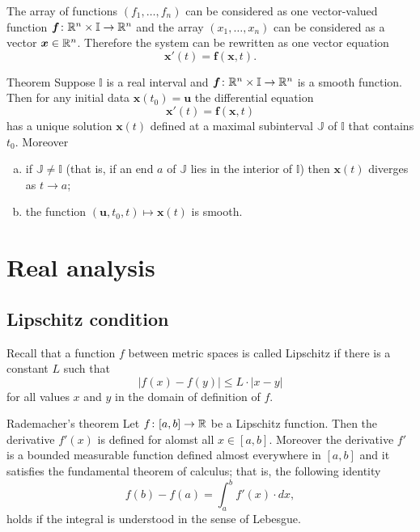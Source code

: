The array of functions $(f_1,\dots,f_n)$ can be considered as one vector-valued function 
$\bm{f}\colon\mathbb{R}^n\times \mathbb{I}\to \mathbb{R}^n$ and the array $(x_1,\dots,x_n)$ can be considered as a vector  $\bm{x}\in\mathbb{R}^n$.
Therefore the system can be rewritten as one vector equation 
\[\bm{x}'(t)=\bm{f}(\bm{x}, t).\] 

\begin{thm}{Theorem}\label{thm:ODE}
Suppose $\mathbb{I}$ is a real interval and $\bm{f}\colon\mathbb{R}^n\times\mathbb{I}\to \mathbb{R}^n$ is a smooth function.
Then for any initial data $\bm{x}(t_0)=\bm{u}$ the differential equation 
\[\bm{x}'(t)=\bm{f}(\bm{x},t)\]
has a unique solution $\bm{x}(t)$ defined at a maximal subinterval $\mathbb{J}$ of $\mathbb{I}$ that contains $t_0$.
Moreover
\begin{enumerate}[(a)]
\item  if $\mathbb{J}\ne \mathbb{I}$ (that is, if an end $a$ of $\mathbb{J}$ lies in the interior of $\mathbb{I}$) then $\bm{x}(t)$ diverges as $t\to a$;
\item  the function $(\bm{u},t_0,t)\mapsto \bm{x}(t)$ is smooth.
\end{enumerate}


\end{thm}

\chapter{Real analysis}

\section{Lipschitz condition}

Recall that a function $f$ between metric spaces is called Lipschitz if there is a constant $L$ such that 
\[|f(x)-f(y)|\le L\cdot|x-y|\]
for all values $x$ and $y$ in the domain of definition of $f$.

\begin{thm}{Rademacher's theorem}\label{thm:rademacher}
Let $f\colon[a,b]\to\mathbb{R}$ be a Lipschitz function.
Then the derivative $f'(x)$ is defined for alomst all $x\in [a,b]$.
Moreover the derivative $f'$ is a bounded measurable function defined almost everywhere in $[a,b]$ and it satisfies the fundamental theorem of calculus; that is, the following identity 
\[f(b)-f(a)=\int_a^b f'(x)\cdot dx,\]
holds if the integral is understood in the sense of Lebesgue.
\end{thm}

